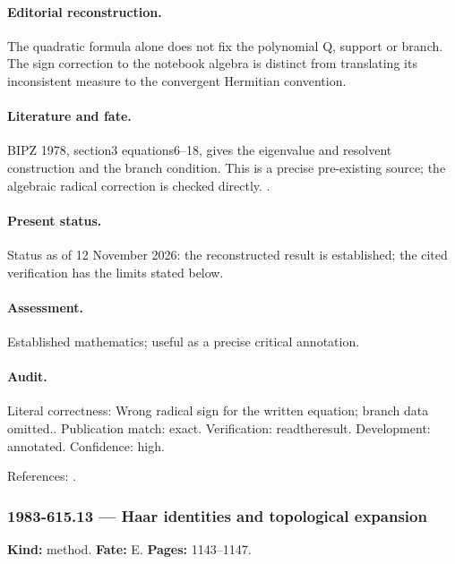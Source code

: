 \paragraph{Editorial reconstruction.} The quadratic formula alone does not fix the polynomial Q, support or branch. The sign correction to the notebook algebra is distinct from translating its inconsistent measure to the convergent Hermitian convention.

\paragraph{Literature and fate.} BIPZ 1978, section3 equations6--18, gives the eigenvalue and resolvent construction and the branch condition. This is a precise pre-existing source; the algebraic radical correction is checked directly. \citep{brezinitzyksonparisizuber1978planar}.

\paragraph{Present status.} Status as of 12 November 2026: the reconstructed result is established; the cited verification has the limits stated below.

\paragraph{Assessment.} Established mathematics; useful as a precise critical annotation.

\paragraph{Audit.} Literal correctness: Wrong radical sign for the written equation; branch data omitted.. Publication match: exact. Verification: readtheresult. Development: annotated. Confidence: high.

\noindent References: \citep{brezinitzyksonparisizuber1978planar}.\par

\subsubsection{1983-615.13 --- Haar identities and topological expansion}

\label{item:1983-615.13}

\noindent\textbf{Kind:} method. \textbf{Fate:} E. \textbf{Pages:} 1143--1147.\par

